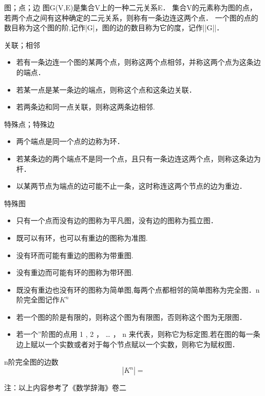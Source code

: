 
\begin{issues}
\end{issues}



\begin{definition}{图；点；边}
图G(V,E)是集合V上的一种二元关系E．
集合V的元素称为图的点，若两个点之间有这种确定的二元关系，则称有一条边连这两个点．
一个图的点的数目称为这个图的阶,记作|G|，图的边的数目称为它的度，记作||G||．
\end{definition}

\begin{definition}{关联；相邻}
\begin{itemize}
\item 若有一条边连一个图的某两个点，则称这两个点相邻，并称这两个点为这条边的端点．
\item 若某一点是某一条边的端点，则称这个点和这条边关联．
\item 若两条边和同一点关联，则称这两条边相邻.
\end{itemize}
\end{definition}
\begin{definition}{特殊点；特殊边}
\begin{itemize}
\item 两个端点是同一个点的边称为环．
\item 若某条边的两个端点不是同一个点，且只有一条边连这两个点，则称这条边为杆．
\item 以某两节点为端点的边可能不止一条，这时称连这两个节点的边为重边．
\end{itemize}
\end{definition}
\begin{definition}{特殊图}
\begin{itemize}
\item 只有一个点而没有边的图称为平凡图，没有边的图称为孤立图．
\item 既可以有环，也可以有重边的图称为准图.
\item 没有环而可能有重边的图称为带重图.
\item 没有重边而可能有环的图称为带环图.
\item 既没有重边也没有环的图称为简单图,每两个点都相邻的简单图称为完全图．n阶完全图记作$K^{n}$
\item 若一个图的阶是有限的，则称这个图为有限图，否则称这个图为无限图．
\item 若一个”阶图的点用 1 , 2 ， … ， n 来代表，则称它为标定图,若在图的每一条边上赋以一个实数或者对于每个节点赋以一个实数，则称它为赋权图．
\end{itemize}
\end{definition}
\begin{theorem}{n阶完全图的边数}
\begin{equation}
|K^{n}|=
\end{equation}

\end{theorem}
注：以上内容参考了《数学辞海》卷二